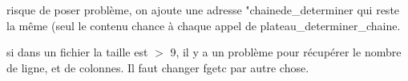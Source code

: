 
\begin{DoxyRefList}
\item[\label{bug__bug000002}%
\hypertarget{bug__bug000002}{}%
\-Membre \hyperlink{tmp_8c_a233209249792b1a2c99163fc53ce62aa}{capture\-Chaines} (\-Plateau plateau, \hyperlink{structPion}{\-Pion} pion, int $\ast$valide)]risque de poser problème, on ajoute une adresse "chainede\-\_\-determiner qui reste la même (seul le contenu chance à chaque appel de plateau\-\_\-determiner\-\_\-chaine.  
\item[\label{bug__bug000001}%
\hypertarget{bug__bug000001}{}%
\-Membre \hyperlink{matrice_8c_ad3b953551d15e015f4f3027ae2f259da}{matrice\-\_\-chargement} (\-F\-I\-L\-E $\ast$fichier)]si dans un fichier la taille est $>$ 9, il y a un problème pour récupérer le nombre de ligne, et de colonnes. \-Il faut changer fgetc par autre chose. 
\end{DoxyRefList}